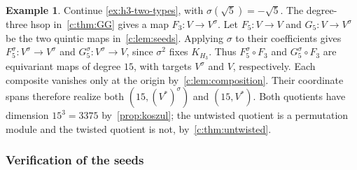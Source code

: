 \documentclass[11pt]{amsart}
\theoremstyle{definition}
\newtheorem{example}[theorem]{Example}
\begin{document}
\begin{example}\label{c:ex:h3-composition}
Continue \cref{ex:h3-two-types}, with $\sigma(\sqrt5)=-\sqrt5$.
The degree-three hsop in~\cref{c:thm:GG} gives a map
$F_3:V\to V^\sigma$. Let $F_5:V\to V$ and $G_5:V\to V^\sigma$
be the two quintic maps in~\cref{c:lem:seeds}.
Applying $\sigma$ to their coefficients gives
$F_5^\sigma:V^\sigma\to V^\sigma$ and
$G_5^\sigma:V^\sigma\to V$, since $\sigma^2$ fixes $K_{H_3}$.
Thus $F_5^\sigma\circ F_3$ and $G_5^\sigma\circ F_3$ are equivariant
maps of degree $15$, with targets $V^\sigma$ and $V$, respectively.
Each composite vanishes only at the origin by~\cref{c:lem:composition}.
Their coordinate spans therefore realize both $(15,(V^*)^\sigma)$
and $(15,V^*)$. Both quotients have dimension $15^3=3375$
by~\cref{prop:koszul}; the untwisted quotient is a permutation module
and the twisted quotient is not, by~\cref{c:thm:untwisted}.
\end{example}

\subsubsection{Verification of the seeds}
\end{document}
